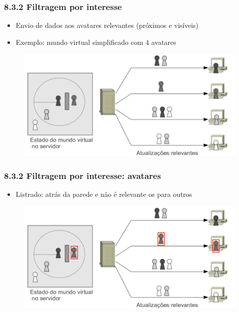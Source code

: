 \documentclass{beamer}
\begin{document}
\begin{frame} 
  \frametitle{8.3.2 Filtragem por interesse}
  \begin{itemize}
    \item Envio de dados aos avatares relevantes (próximos e visíveis)
    \item Exemplo: mundo virtual simplificado com 4 avatares
  \end{itemize}
  \begin{figure}[h]
    \centering
    \vspace{-18pt}
    \includegraphics[width=1.03\textwidth]{imagem_82.png}
    \vspace{-20pt}
  \end{figure}
\end{frame}

\begin{frame} 
  \frametitle{8.3.2 Filtragem por interesse: avatares}
  \begin{itemize}
    \item Listrado: atrás da parede e não é relevante os para outros
  \end{itemize}
  \begin{figure}[h]
    \centering
    \vspace{-18pt}
    \includegraphics[width=1.03\textwidth]{imagem_82_Listrado.png}
    \vspace{-20pt}
  \end{figure}
\end{frame}
\end{document}
